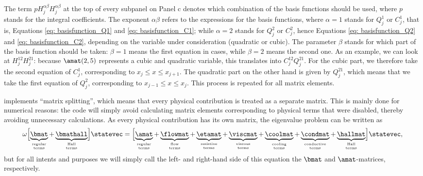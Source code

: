 The term $pH_j^{\alpha\beta}H_j^{\alpha\beta}$ at the top of every subpanel on Panel c denotes which combination of the basis functions should be used, where $p$ stands for the integral coefficients. The exponent $\alpha\beta$ refers to the expressions for the basis functions, where $\alpha = 1$ stands for $Q_j^1$ or $C_j^1$, that is, Equations \eqref{eq: basisfunction_Q1} and \eqref{eq: basisfunction_C1}; while $\alpha = 2$ stands for $Q_j^2$ or $C_j^2$, hence Equations \eqref{eq: basisfunction_Q2} and \eqref{eq: basisfunction_C2}, depending on the variable under consideration (quadratic or cubic). The parameter $\beta$ stands for which part of the basis function should be taken: $\beta = 1$ means the first equation in cases, while $\beta = 2$ means the second one. As an example, we can look at $H_j^{12}H_j^{21}$: because $\amat(2, 5)$ represents a cubic and quadratic variable, this translates into $C_j^{12}Q_j^{21}$. For the cubic part, we therefore take the second equation of $C_j^1$, corresponding to $x_j \leq x \leq x_{j + 1}$. The quadratic part on the other hand is given by $Q_j^{21}$, which means that we take the first equation of $Q_j^2$, corresponding to $x_{j-1} \leq x \leq x_j$. This process is repeated for all matrix elements.

{\legolas} implements ``matrix splitting'', which means that every physical contribution is treated as a separate matrix. This is mainly done for numerical reasons: the code will simply avoid calculating matrix elements corresponding to physical terms that were disabled, thereby avoiding unnecessary calculations. As every physical contribution has its own matrix, the eigenvalue problem can be written as
\begin{equation}
	\omega \Bigl[
	\underbrace{\bmat}_{\substack{\text{\tiny regular} \\ \text{\tiny terms}}}
	+ \underbrace{\bmathall}_{\substack{\text{\tiny Hall} \\ \text{\tiny terms}}}
	\Bigr]\statevec
	= \Bigl[
		\underbrace{\amat}_{\substack{\text{\tiny regular} \\ \text{\tiny terms}}}
		+ \underbrace{\flowmat}_{\substack{\text{\tiny flow} \\ \text{\tiny terms}}}
		+ \underbrace{\etamat}_{\substack{\text{\tiny resistive} \\ \text{\tiny terms}}}
		+ \underbrace{\viscmat}_{\substack{\text{\tiny viscous} \\ \text{\tiny terms}}}
		+ \underbrace{\coolmat}_{\substack{\text{\tiny cooling} \\ \text{\tiny terms}}}
		+ \underbrace{\condmat}_{\substack{\text{\tiny conductive} \\ \text{\tiny terms}}}
		+ \underbrace{\hallmat}_{\substack{\text{\tiny Hall} \\ \text{\tiny terms}}}
	\Bigr]\statevec,
\end{equation}
but for all intents and purposes we will simply call the left- and right-hand side of this equation the $\bmat$ and $\amat$-matrices, respectively.


